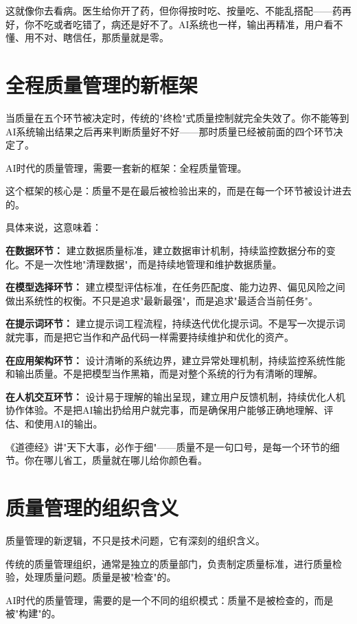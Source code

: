 这就像你去看病。医生给你开了药，但你得按时吃、按量吃、不能乱搭配——药再好，你不吃或者吃错了，病还是好不了。AI系统也一样，输出再精准，用户看不懂、用不对、瞎信任，那质量就是零。

\section{全程质量管理的新框架}


当质量在五个环节被决定时，传统的"终检"式质量控制就完全失效了。你不能等到AI系统输出结果之后再来判断质量好不好——那时质量已经被前面的四个环节决定了。

AI时代的质量管理，需要一套新的框架：全程质量管理。

这个框架的核心是：质量不是在最后被检验出来的，而是在每一个环节被设计进去的。

具体来说，这意味着：

\textbf{在数据环节：} 建立数据质量标准，建立数据审计机制，持续监控数据分布的变化。不是一次性地"清理数据"，而是持续地管理和维护数据质量。

\textbf{在模型选择环节：} 建立模型评估标准，在任务匹配度、能力边界、偏见风险之间做出系统性的权衡。不只是追求"最新最强"，而是追求"最适合当前任务"。

\textbf{在提示词环节：} 建立提示词工程流程，持续迭代优化提示词。不是写一次提示词就完事，而是把它当作和产品代码一样需要持续维护和优化的资产。

\textbf{在应用架构环节：} 设计清晰的系统边界，建立异常处理机制，持续监控系统性能和输出质量。不是把模型当作黑箱，而是对整个系统的行为有清晰的理解。

\textbf{在人机交互环节：} 设计易于理解的输出呈现，建立用户反馈机制，持续优化人机协作体验。不是把AI输出扔给用户就完事，而是确保用户能够正确地理解、评估、和使用AI的输出。

《道德经》讲"天下大事，必作于细"——质量不是一句口号，是每一个环节的细节。你在哪儿省工，质量就在哪儿给你颜色看。

\section{质量管理的组织含义}


质量管理的新逻辑，不只是技术问题，它有深刻的组织含义。

传统的质量管理组织，通常是独立的质量部门，负责制定质量标准，进行质量检验，处理质量问题。质量是被"检查"的。

AI时代的质量管理，需要的是一个不同的组织模式：质量不是被检查的，而是被"构建"的。


